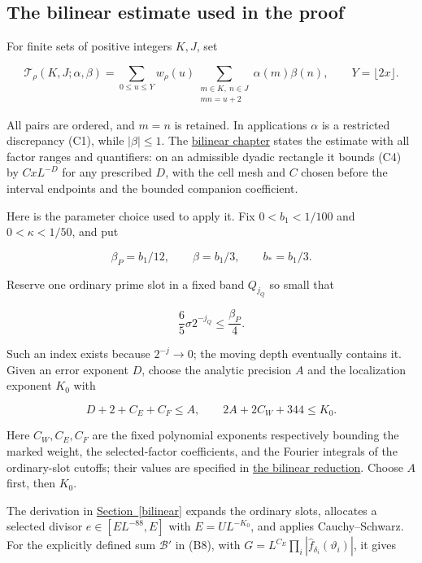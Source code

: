 
\hypertarget{correlation-the-bilinear-estimate-used-in-the-proof}{%
\subsection{The bilinear estimate used in the
proof}\label{correlation-the-bilinear-estimate-used-in-the-proof}}

For finite sets of positive integers \(K,J\), set

\[
\mathcal T_\rho(K,J;\alpha,\beta)
 =\sum_{0\le u\le Y}w_\rho(u)
   \sum_{\substack{m\in K,\ n\in J\\mn=u+2}}\alpha(m)\beta(n),
\qquad Y=\lfloor2x\rfloor. \tag{C4}
\]

All pairs are ordered, and \(m=n\) is retained. In applications
\(\alpha\) is a restricted discrepancy (C1), while \(|\beta|\le1\). The
\protect\hyperlink{bilinear-the-statement-on-one-factor-rectangle}{bilinear
chapter} states the estimate with all factor ranges and quantifiers: on
an admissible dyadic rectangle it bounds (C4) by \(CxL^{-D}\) for any
prescribed \(D\), with the cell mesh and \(C\) chosen before the
interval endpoints and the bounded companion coefficient.

Here is the parameter choice used to apply it. Fix \(0<b_1<1/100\) and
\(0<\kappa<1/50\), and put

\[
\beta_P=b_1/12,\qquad \beta=b_1/3,\qquad b_*=b_1/3.
\]

Reserve one ordinary prime slot in a fixed band \(Q_{j_Q}\) so small
that

\[
\frac65\sigma2^{-j_Q}\le\frac{\beta_P}{4}.
\]

Such an index exists because \(2^{-j}\to0\); the moving depth eventually
contains it. Given an error exponent \(D\), choose the analytic
precision \(A\) and the localization exponent \(K_0\) with

\[
D+2+C_E+C_F\le A,\qquad 2A+2C_W+344\le K_0. \tag{C5}
\]

Here \(C_W,C_E,C_F\) are the fixed polynomial exponents respectively
bounding the marked weight, the selected-factor coefficients, and the
Fourier integrals of the ordinary-slot cutoffs; their values are
specified in \protect\hyperlink{bilinear}{the bilinear reduction}.
Choose \(A\) first, then \(K_0\).

The derivation in \protect\hyperlink{bilinear}{Section~\ref{bilinear}}
expands the ordinary slots, allocates a selected divisor
\(e\in[EL^{-88},E]\) with \(E=UL^{-K_0}\), and applies Cauchy--Schwarz.
For the explicitly defined sum \(\mathcal B'\) in (B8), with
\(G=L^{C_E}\prod_i|\widehat f_{\delta_i}(\vartheta_i)|\), it gives

